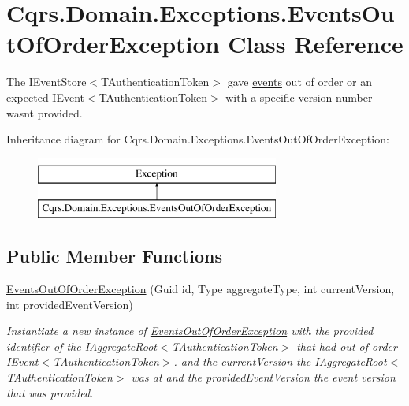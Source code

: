 \hypertarget{classCqrs_1_1Domain_1_1Exceptions_1_1EventsOutOfOrderException}{}\section{Cqrs.\+Domain.\+Exceptions.\+Events\+Out\+Of\+Order\+Exception Class Reference}
\label{classCqrs_1_1Domain_1_1Exceptions_1_1EventsOutOfOrderException}


The I\+Event\+Store$<$\+T\+Authentication\+Token$>$ gave \hyperlink{}{events} out of order or an expected I\+Event$<$\+T\+Authentication\+Token$>$ with a specific version number wasn\textquotesingle{}t provided.  


Inheritance diagram for Cqrs.\+Domain.\+Exceptions.\+Events\+Out\+Of\+Order\+Exception\+:\begin{figure}[H]
\begin{center}
\leavevmode
\includegraphics[height=2.000000cm]{classCqrs_1_1Domain_1_1Exceptions_1_1EventsOutOfOrderException}
\end{center}
\end{figure}
\subsection*{Public Member Functions}
\begin{DoxyCompactItemize}
\item 
\hyperlink{classCqrs_1_1Domain_1_1Exceptions_1_1EventsOutOfOrderException_aebc1013f20fc9a5fb4644e85cf5241b0_aebc1013f20fc9a5fb4644e85cf5241b0}{Events\+Out\+Of\+Order\+Exception} (Guid id, Type aggregate\+Type, int current\+Version, int provided\+Event\+Version)
\begin{DoxyCompactList}\small\item\em Instantiate a new instance of \hyperlink{classCqrs_1_1Domain_1_1Exceptions_1_1EventsOutOfOrderException}{Events\+Out\+Of\+Order\+Exception} with the provided identifier of the I\+Aggregate\+Root$<$\+T\+Authentication\+Token$>$ that had out of order I\+Event$<$\+T\+Authentication\+Token$>$. and the {\itshape current\+Version}  the I\+Aggregate\+Root$<$\+T\+Authentication\+Token$>$ was at and the {\itshape provided\+Event\+Version} the event version that was provided. \end{DoxyCompactList}\end{DoxyCompactItemize}
